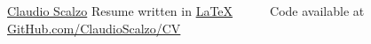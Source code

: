 \documentclass[11pt, a4paper]{awesome-cv}
\begin{document}
\makecvheader[L]

\makecvfooter
  {\href{https://www.linkedin.com/in/claudioscalzo}{Claudio Scalzo}}
  {}
  {Resume written in \href{https://www.latex-project.org}{\LaTeX}~~~\textbullet~~~Code available at \href{https://github.com/claudioscalzo/cv}{GitHub.com/ClaudioScalzo/CV}}








\end{document}
